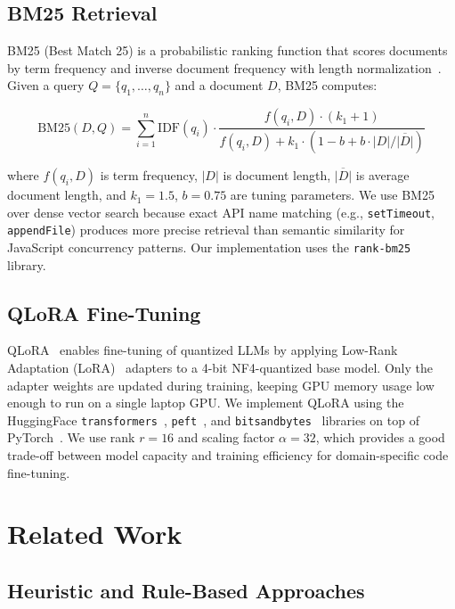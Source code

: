 \documentclass[runningheads]{llncs}
\begin{document}
\subsection{BM25 Retrieval}
\label{sec:bg:bm25}

BM25 (Best Match 25) is a probabilistic ranking function that scores
documents by term frequency and inverse document frequency with length
normalization~\cite{bm25robertson}.
Given a query $Q = \{q_1, \ldots, q_n\}$ and a document $D$, BM25 computes:

\[
  \text{BM25}(D, Q) = \sum_{i=1}^{n} \text{IDF}(q_i) \cdot
  \frac{f(q_i, D) \cdot (k_1 + 1)}{f(q_i, D) + k_1 \cdot (1 - b + b \cdot |D| / \overline{|D|})}
\]

where $f(q_i, D)$ is term frequency, $|D|$ is document length,
$\overline{|D|}$ is average document length, and $k_1 = 1.5$, $b = 0.75$
are tuning parameters.
We use BM25 over dense vector search because exact API name matching
(e.g., \texttt{setTimeout}, \texttt{appendFile}) produces more precise
retrieval than semantic similarity for JavaScript concurrency patterns.
Our implementation uses the \texttt{rank-bm25}~\cite{rankbm25} library.

\subsection{QLoRA Fine-Tuning}
\label{sec:bg:qlora}

QLoRA~\cite{qlora} enables fine-tuning of quantized LLMs by applying
Low-Rank Adaptation (LoRA)~\cite{lora} adapters to a 4-bit NF4-quantized base model.
Only the adapter weights are updated during training, keeping GPU memory
usage low enough to run on a single laptop GPU.
We implement QLoRA using the HuggingFace \texttt{transformers}~\cite{transformers},
\texttt{peft}~\cite{peft}, and \texttt{bitsandbytes}~\cite{bitsandbytes}
libraries on top of PyTorch~\cite{pytorch}.
We use rank $r = 16$ and scaling factor $\alpha = 32$, which provides
a good trade-off between model capacity and training efficiency for
domain-specific code fine-tuning.

\section{Related Work}
\label{sec:related}

\subsection{Heuristic and Rule-Based Approaches}
\label{sec:related:rules}
\end{document}
